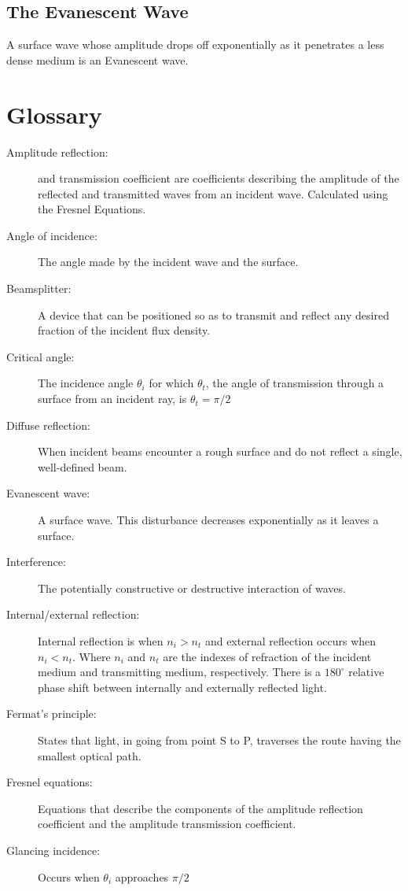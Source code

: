 \documentclass[12pt]{report}
\begin{document}
\subsection{The Evanescent Wave}
A surface wave whose amplitude drops off exponentially as it penetrates a less dense medium is an Evanescent wave. 

\section{Glossary}
\begin{description}
\item[Amplitude reflection: ] and transmission coefficient are coefficients describing the amplitude of the reflected and transmitted waves from an incident wave. Calculated using the Fresnel Equations. 
\item[Angle of incidence: ] The angle made by the incident wave and the surface. 
\item[Beamsplitter: ] A device that can be positioned so as to transmit and reflect any desired fraction of the incident flux density. 
\item[Critical angle: ] The incidence angle $\theta_i$ for which $\theta_t$, the angle of transmission through a surface from an incident ray, is  $\theta_t=\pi/2$
\item[Diffuse reflection: ] When incident beams encounter a rough surface and do not reflect a single, well-defined beam.
\item[Evanescent wave: ] A surface wave. This disturbance decreases exponentially as it leaves a surface. 
\item[Interference: ] The potentially constructive or destructive interaction of waves. 
\item[Internal/external reflection: ] Internal reflection is when $n_i>n_t$ and external reflection occurs when $n_i<n_t$. Where $n_i$ and $n_t$ are the indexes of refraction of the incident medium and transmitting medium, respectively. There is a $180^\circ$ relative phase shift between internally and externally reflected light. 
\item[Fermat's principle: ] States that light, in going from point S to P, traverses the route having the smallest optical path. 
\item[Fresnel equations: ] Equations that describe the components of the amplitude reflection coefficient and the amplitude transmission coefficient. 
\item[Glancing incidence: ] Occurs when $\theta_i$ approaches $\pi/2$

\end{description}
\end{document}
